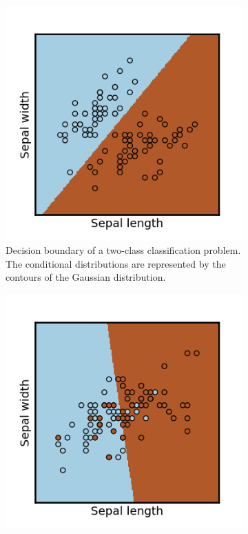 \begin{refsection}
\begin{figure}[H]
	\centering
	\begin{subfigure}[t]{0.45\textwidth}
		\centering
		\includegraphics[width=1\linewidth]{../figures/statisticalLearning/linearModelClassification/logisticRegressionIrisDemo1}
		\caption{Decision boundary of a two-class classification problem. The conditional distributions are represented by the contours of the Gaussian distribution.}
	\end{subfigure}\quad
	\begin{subfigure}[t]{0.45\textwidth}
		\centering
		\includegraphics[width=1\linewidth]{../figures/statisticalLearning/linearModelClassification/logisticRegressionIrisDemo2}

\end{subfigure}
\end{figure}
\end{refsection}
